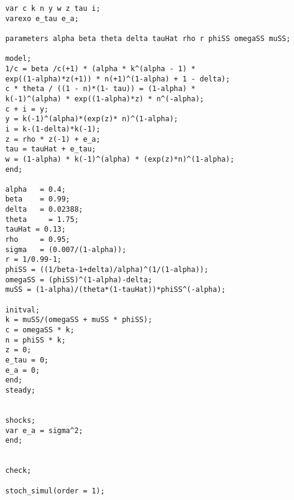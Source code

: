\documentclass[12pt]{extreport}
\begin{document}
	\begin{verbatim}
	var c k n y w z tau i;
	varexo e_tau e_a;
	
	parameters alpha beta theta delta tauHat rho r phiSS omegaSS muSS;
	
	model;
	1/c = beta /c(+1) * (alpha * k^(alpha - 1) * 
	exp((1-alpha)*z(+1)) * n(+1)^(1-alpha) + 1 - delta);
	c * theta / ((1 - n)*(1- tau)) = (1-alpha) * 
	k(-1)^(alpha) * exp((1-alpha)*z) * n^(-alpha);
	c + i = y;
	y = k(-1)^(alpha)*(exp(z)* n)^(1-alpha);
	i = k-(1-delta)*k(-1);
	z = rho * z(-1) + e_a;
	tau = tauHat + e_tau;
	w = (1-alpha) * k(-1)^(alpha) * (exp(z)*n)^(1-alpha);
	end;
	
	alpha   = 0.4;
	beta    = 0.99;
	delta   = 0.02388;
	theta     = 1.75;
	tauHat = 0.13;
	rho     = 0.95;
	sigma   = (0.007/(1-alpha));
	r = 1/0.99-1;
	phiSS = ((1/beta-1+delta)/alpha)^(1/(1-alpha));
	omegaSS = (phiSS)^(1-alpha)-delta;
	muSS = (1-alpha)/(theta*(1-tauHat))*phiSS^(-alpha);
	
	initval;
	k = muSS/(omegaSS + muSS * phiSS);
	c = omegaSS * k;
	n = phiSS * k;
	z = 0;
	e_tau = 0;
	e_a = 0;
	end;
	steady;
	
	
	shocks;
	var e_a = sigma^2;
	end;
	
	
	check;
	
	stoch_simul(order = 1);
	\end{verbatim}
\end{document}
